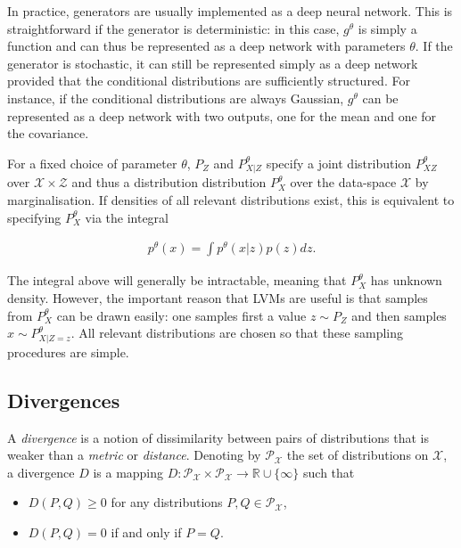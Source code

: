 In practice, generators are usually implemented as a deep neural network.
This is straightforward if the generator is deterministic: in this case, $g^\theta$ is simply a function and can thus be represented as a deep network with parameters $\theta$.
If the generator is stochastic, it can still be represented simply as a deep network provided that the conditional distributions are sufficiently structured. 
For instance, if the conditional distributions are always Gaussian, $g^\theta$ can be represented as a deep network with two outputs, one for the mean and one for the covariance.

For a fixed choice of parameter $\theta$, $P_Z$ and $P^\theta_{X|Z}$ specify a joint distribution $P^\theta_{XZ}$ over $\mathcal{X} \times \mathcal{Z}$ and thus a distribution distribution $P_X^\theta$ over the data-space $\mathcal{X}$ by marginalisation. 
If densities of all relevant distributions exist, this is equivalent to specifying $P_X^\theta$ via the integral

\begin{align*}
p^\theta(x) = \int p^\theta(x|z) p(z) dz.
\end{align*}

The integral above will generally be intractable, meaning that $P_X^\theta$ has unknown density.
However, the important reason that LVMs are useful is that samples from $P_X^\theta$ can be drawn easily:
one samples first a value $z\sim P_Z$ and then samples $x \sim P^\theta_{X|Z=z}$. 
All relevant distributions are chosen so that these sampling procedures are simple.


\subsection{Divergences}\label{subsec:gen-model-divergence}

A \emph{divergence} is a notion of dissimilarity between pairs of distributions that is weaker than a \emph{metric} or \emph{distance}. 
Denoting by $\mathcal{P}_{\mathcal{X}}$ the set of distributions on $\mathcal{X}$, a divergence $D$ is a mapping $D: \mathcal{P}_{\mathcal{X}} \times \mathcal{P}_{\mathcal{X}} \to \mathbb{R} \cup \{\infty\}$ such that

\begin{itemize}
\item $D(P, Q)  \geq 0$ for any distributions $P, Q \in \mathcal{P}_{\mathcal{X}}$,
\item $D(P, Q) = 0$ if and only if $P = Q$.
\end{itemize}

